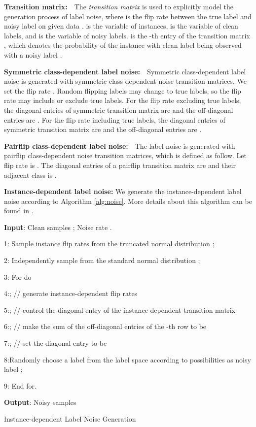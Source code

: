 \documentclass[11pt]{article}
\begin{document}
\noindent \textbf{Transition matrix:}\ \  The \textit{transition matrix}  is used to explicitly model the generation process of label noise, where  is the flip rate between the true label  and noisy label on given
data .  is the variable of instances,  is the variable of clean labels, and  is the variable of noisy labels.  is the -th entry of the transition matrix , which denotes the probability of the instance  with clean label  being observed with a noisy label .

\noindent \textbf{Symmetric class-dependent label noise:}\ \ Symmetric class-dependent label noise is generated with symmetric class-dependent noise transition matrices. We set the flip rate . Random flipping labels may change to true labels, so the flip rate may include or exclude true labels. For the flip rate excluding true labels, the diagonal entries of symmetric transition matrix are  and the off-diagonal entries are . For the flip rate including true labels, the diagonal entries of symmetric transition matrix are  and the off-diagonal entries are .

\noindent \textbf{Pairflip class-dependent label noise:}\ \ The label noise is generated with pairflip class-dependent noise transition matrices, which is defined as follow. Let flip rate is . The diagonal entries of a pairflip transition matrix are  and their adjacent class is .

\noindent \textbf{Instance-dependent label noise:} We generate the instance-dependent label noise according to  Algorithm \ref{alg:noise}. More details about this algorithm can be found in \cite{xia2020parts}.

\begin{algorithm}[h!]
 {\bfseries Input}: Clean samples ; Noise rate .
 
	1: Sample instance flip rates  from the truncated normal distribution ;
	
	2: Independently sample  from the standard normal distribution ;
	
	3: For  do
	
    4:\quad ; \hfill// generate instance-dependent flip rates
    
    5:\quad  ; \hfill// control the diagonal entry of the instance-dependent transition matrix
    
    6:\quad  ; \hfill// make the sum of the off-diagonal entries of the -th row to be 
    
    7:\quad  ; \hfill// set the diagonal entry to be 
    
    8:\quad  Randomly choose a label from the label space according to possibilities  as noisy label ;
    
	9: End for.
	
{\bfseries Output}: Noisy samples 
\caption{Instance-dependent Label Noise Generation}
\label{alg:noise}
\end{algorithm}
\end{document}
